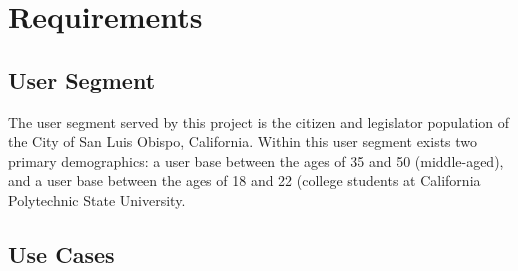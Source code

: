 \section{Requirements}

\subsection{User Segment}
The user segment served by this project is the citizen and legislator population of
the City of San Luis Obispo, California. Within this user segment
exists two primary demographics: a user base between the ages of 35 and 50
(middle-aged), and a user base between the ages of 18 and 22 (college students
at California Polytechnic State University.
\subsection{Use Cases}


